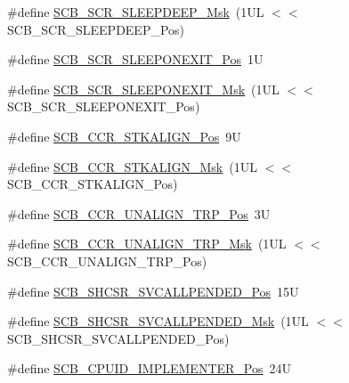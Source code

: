 \begin{DoxyCompactItemize}
\item 
\#define \mbox{\hyperlink{group___c_m_s_i_s___s_c_b_ga77c06a69c63f4b3f6ec1032e911e18e7}{S\+C\+B\+\_\+\+S\+C\+R\+\_\+\+S\+L\+E\+E\+P\+D\+E\+E\+P\+\_\+\+Msk}}~(1\+U\+L $<$$<$ S\+C\+B\+\_\+\+S\+C\+R\+\_\+\+S\+L\+E\+E\+P\+D\+E\+E\+P\+\_\+\+Pos)
\item 
\#define \mbox{\hyperlink{group___c_m_s_i_s___s_c_b_ga3680a15114d7fdc1e25043b881308fe9}{S\+C\+B\+\_\+\+S\+C\+R\+\_\+\+S\+L\+E\+E\+P\+O\+N\+E\+X\+I\+T\+\_\+\+Pos}}~1U
\item 
\#define \mbox{\hyperlink{group___c_m_s_i_s___s_c_b_ga50a243e317b9a70781b02758d45b05ee}{S\+C\+B\+\_\+\+S\+C\+R\+\_\+\+S\+L\+E\+E\+P\+O\+N\+E\+X\+I\+T\+\_\+\+Msk}}~(1\+U\+L $<$$<$ S\+C\+B\+\_\+\+S\+C\+R\+\_\+\+S\+L\+E\+E\+P\+O\+N\+E\+X\+I\+T\+\_\+\+Pos)
\item 
\#define \mbox{\hyperlink{group___c_m_s_i_s___s_c_b_gac2d20a250960a432cc74da59d20e2f86}{S\+C\+B\+\_\+\+C\+C\+R\+\_\+\+S\+T\+K\+A\+L\+I\+G\+N\+\_\+\+Pos}}~9U
\item 
\#define \mbox{\hyperlink{group___c_m_s_i_s___s_c_b_ga33cf22d3d46af158a03aad25ddea1bcb}{S\+C\+B\+\_\+\+C\+C\+R\+\_\+\+S\+T\+K\+A\+L\+I\+G\+N\+\_\+\+Msk}}~(1\+U\+L $<$$<$ S\+C\+B\+\_\+\+C\+C\+R\+\_\+\+S\+T\+K\+A\+L\+I\+G\+N\+\_\+\+Pos)
\item 
\#define \mbox{\hyperlink{group___c_m_s_i_s___s_c_b_gac4e4928b864ea10fc24dbbc57d976229}{S\+C\+B\+\_\+\+C\+C\+R\+\_\+\+U\+N\+A\+L\+I\+G\+N\+\_\+\+T\+R\+P\+\_\+\+Pos}}~3U
\item 
\#define \mbox{\hyperlink{group___c_m_s_i_s___s_c_b_ga68c96ad594af70c007923979085c99e0}{S\+C\+B\+\_\+\+C\+C\+R\+\_\+\+U\+N\+A\+L\+I\+G\+N\+\_\+\+T\+R\+P\+\_\+\+Msk}}~(1\+U\+L $<$$<$ S\+C\+B\+\_\+\+C\+C\+R\+\_\+\+U\+N\+A\+L\+I\+G\+N\+\_\+\+T\+R\+P\+\_\+\+Pos)
\item 
\#define \mbox{\hyperlink{group___c_m_s_i_s___s_c_b_ga2f93ec9b243f94cdd3e94b8f0bf43641}{S\+C\+B\+\_\+\+S\+H\+C\+S\+R\+\_\+\+S\+V\+C\+A\+L\+L\+P\+E\+N\+D\+E\+D\+\_\+\+Pos}}~15U
\item 
\#define \mbox{\hyperlink{group___c_m_s_i_s___s_c_b_ga6095a7acfbad66f52822b1392be88652}{S\+C\+B\+\_\+\+S\+H\+C\+S\+R\+\_\+\+S\+V\+C\+A\+L\+L\+P\+E\+N\+D\+E\+D\+\_\+\+Msk}}~(1\+U\+L $<$$<$ S\+C\+B\+\_\+\+S\+H\+C\+S\+R\+\_\+\+S\+V\+C\+A\+L\+L\+P\+E\+N\+D\+E\+D\+\_\+\+Pos)
\item 
\#define \mbox{\hyperlink{group___c_m_s_i_s___s_c_b_ga58686b88f94f789d4e6f429fe1ff58cf}{S\+C\+B\+\_\+\+C\+P\+U\+I\+D\+\_\+\+I\+M\+P\+L\+E\+M\+E\+N\+T\+E\+R\+\_\+\+Pos}}~24U
\item 
$$
\end{DoxyCompactItemize}
